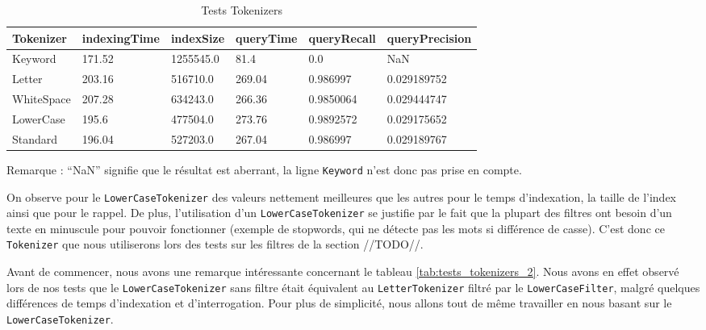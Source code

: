 \begin{table}[!htbp]
    \hspace{-1.5cm}
                \begin{tabular}{|p{2.5cm}|p{2.5cm}|p{2.5cm}|p{2.5cm}|p{2.5cm}|p{2.5cm}|}
                    \hline
                    \textbf{Tokenizer} & \textbf{indexingTime} & \textbf{indexSize} & \textbf{queryTime} & \textbf{queryRecall} & \textbf{queryPrecision}\\
                    \hline     
Keyword & 171.52 & 1255545.0 & 81.4 & 0.0 & NaN\\
		\hline
Letter & 203.16 & 516710.0 & 269.04 & 0.986997 & 0.029189752\\
		\hline
WhiteSpace & 207.28 & 634243.0 & 266.36 & 0.9850064 & 0.029444747\\
		\hline
LowerCase & 195.6 & 477504.0 & 273.76 & 0.9892572 & 0.029175652\\
		\hline
Standard & 196.04 & 527203.0 & 267.04 & 0.986997 & 0.029189767\\
                    \hline
                \end{tabular}
                \caption{Tests Tokenizers}
                \label{tab:tests_tokenizers}
            \end{table}

Remarque : “NaN” signifie que le résultat est aberrant, la ligne \texttt{Keyword} n’est donc pas prise en compte.

On observe pour le \texttt{LowerCaseTokenizer} des valeurs nettement meilleures que les autres pour le temps d’indexation, la taille de l’index ainsi que pour le rappel. De plus, l'utilisation d'un \texttt{LowerCaseTokenizer} se justifie par le fait que la plupart des filtres ont besoin d'un texte en minuscule pour pouvoir fonctionner (exemple de stopwords, qui ne détecte pas les mots si différence de casse). C’est donc ce \texttt{Tokenizer} que nous utiliserons lors des tests sur les filtres de la section //TODO//.

Avant de commencer, nous avons une remarque intéressante concernant le tableau \ref{tab:tests_tokenizers_2}. Nous avons en effet observé lors de nos tests que le \texttt{LowerCaseTokenizer} sans filtre était équivalent au \texttt{LetterTokenizer} filtré par le \texttt{LowerCaseFilter}, malgré quelques différences de temps d’indexation et d’interrogation. Pour plus de simplicité, nous allons tout de même travailler en nous basant sur le \texttt{LowerCaseTokenizer}.

